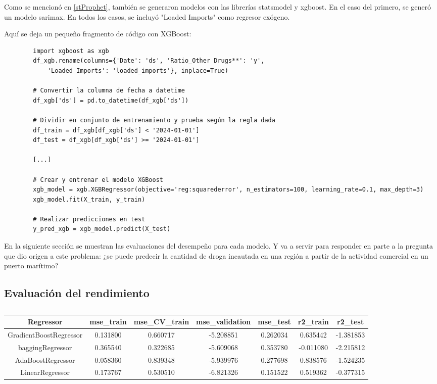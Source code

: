 \documentclass[12pt]{article}
\begin{document}
 	Como se mencionó en \ref{stProphet}, también se generaron modelos con las librerías statsmodel y xgboost. En el caso del primero, se generó un modelo sarimax. En todos los casos, se incluyó "Loaded Imports" como regresor exógeno.
 	
 	Aquí se deja un pequeño fragmento de código con XGBoost:
 	\begin{verbatim}
 		import xgboost as xgb
 		df_xgb.rename(columns={'Date': 'ds', 'Ratio_Other Drugs**': 'y', 
 			'Loaded Imports': 'loaded_imports'}, inplace=True)
 		
 		# Convertir la columna de fecha a datetime
 		df_xgb['ds'] = pd.to_datetime(df_xgb['ds'])
 		
 		# Dividir en conjunto de entrenamiento y prueba según la regla dada
 		df_train = df_xgb[df_xgb['ds'] < '2024-01-01']
 		df_test = df_xgb[df_xgb['ds'] >= '2024-01-01']
 		
 		[...]
 		
 		# Crear y entrenar el modelo XGBoost
 		xgb_model = xgb.XGBRegressor(objective='reg:squarederror', n_estimators=100, learning_rate=0.1, max_depth=3)
 		xgb_model.fit(X_train, y_train)
 		
 		# Realizar predicciones en test
 		y_pred_xgb = xgb_model.predict(X_test)
 	\end{verbatim}
 
 	En la siguiente sección se muestran las evaluaciones del desempeño para cada modelo. Y va a servir para responder en parte a la pregunta que dio origen a este problema: ¿se puede predecir la cantidad de droga incautada en una región a partir de la actividad comercial en un puerto marítimo?

	\subsection{\label{eval performance}Evaluación del rendimiento}
	\begingroup
	\begin{table}[H]
	\caption{\label{tabla}}
		\centering
		\setlength{\tabcolsep}{3pt}
		\renewcommand{\arraystretch}{1.5}
		\begin{tabular}{|c|c|c|c|c|c|c|}
			\hline
			Regressor &	mse\_train &	mse\_CV\_train &	mse\_validation &	mse\_test &	r2\_train &	r2\_test \\
			\hline
			GradientBoostRegressor &	0.131800 &	0.660717 &	-5.208851 &	0.262034 &	0.635442 &	-1.381853 \\
			baggingRegressor &	0.365540 &	0.322685 &	-5.609068 &	0.353780 &	-0.011080 &	-2.215812 \\
			AdaBoostRegressor &	0.058360 &	0.839348 &	-5.939976 &	0.277698 &	0.838576 &	-1.524235 \\
			LinearRegressor &	0.173767 &	0.530510 &	-6.821326 &	0.151522 &	0.519362 &	-0.377315 \\
			\hline
		\end{tabular}
	\end{table}
	\endgroup
\end{document}

